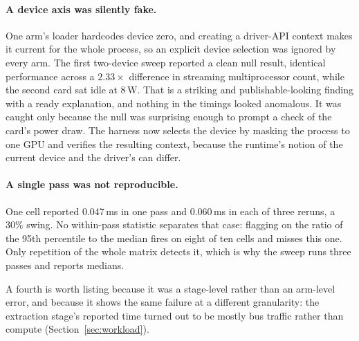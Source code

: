 \documentclass[11pt]{article}
\begin{document}
\paragraph{A device axis was silently fake.} One arm's loader hardcodes device
zero, and creating a driver-API context makes it current for the whole process,
so an explicit device selection was ignored by every arm. The first two-device
sweep reported a clean null result, identical performance across a $2.33\times$
difference in streaming multiprocessor count, while the second card sat idle at
8\,W. That is a striking and publishable-looking finding with a ready
explanation, and nothing in the timings looked anomalous. It was caught only
because the null was surprising enough to prompt a check of the card's power
draw. The harness now selects the device by masking the process to one GPU and
verifies the resulting context, because the runtime's notion of the current
device and the driver's can differ.

\paragraph{A single pass was not reproducible.} One cell reported 0.047\,ms in
one pass and 0.060\,ms in each of three reruns, a 30\% swing. No within-pass
statistic separates that case: flagging on the ratio of the 95th percentile to
the median fires on eight of ten cells and misses this one. Only repetition of
the whole matrix detects it, which is why the sweep runs three passes and reports
medians.

A fourth is worth listing because it was a stage-level rather than an arm-level
error, and because it shows the same failure at a different granularity: the
extraction stage's reported time turned out to be mostly bus traffic rather than
compute (Section~\ref{sec:workload}).
\end{document}
